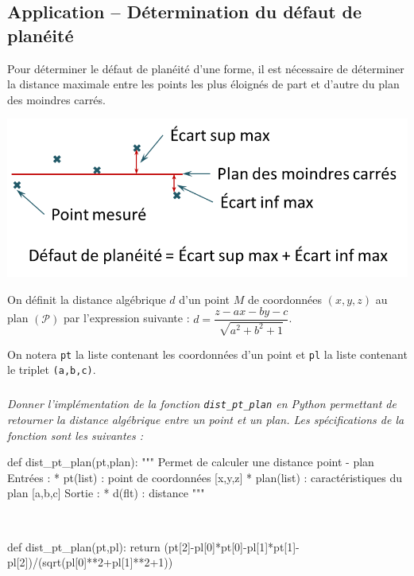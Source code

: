 \subsection{Application -- Détermination du défaut de planéité}

\ifprof
\else

Pour déterminer le défaut de planéité d'une forme, il est nécessaire de déterminer la distance maximale entre les points les plus éloignés de part et d'autre du plan des moindres carrés.

\begin{center}
\includegraphics[width=.7\linewidth]{images/planeite_2}
\end{center}
On définit la distance algébrique $d$ d'un point $M$ de coordonnées $\left(x,y,z\right)$ au plan $\left( \mathcal{P}\right)$ par l'expression suivante :
$d = \dfrac{z - a x -b y -c}{\sqrt{a^2+b^2+1}}$.

On notera \texttt{pt} la liste contenant les coordonnées d'un point et \texttt{pl} la liste contenant le triplet \texttt{(a,b,c)}.

\fi 

\subparagraph{}
\textit{Donner l'implémentation de la fonction  \texttt{dist\_pt\_plan} en Python permettant de retourner la distance algébrique entre un point et un plan. Les spécifications de la fonction sont les suivantes :}
\begin{py}
\begin{python}
def dist_pt_plan(pt,plan):
    """
    Permet de calculer une distance point - plan
    Entrées : 
        * pt(list) : point de coordonnées [x,y,z]
        * plan(list) : caractéristiques du plan [a,b,c]
    Sortie : 
        * d(flt) : distance
    """
\end{python}
\end{py}
\ifprof
\begin{corrige}~\\
\begin{python}
def dist_pt_plan(pt,pl):
    return (pt[2]-pl[0]*pt[0]-pl[1]*pt[1]-pl[2])/(sqrt(pl[0]**2+pl[1]**2+1))
\end{python}
\end{corrige}
\else
\fi


